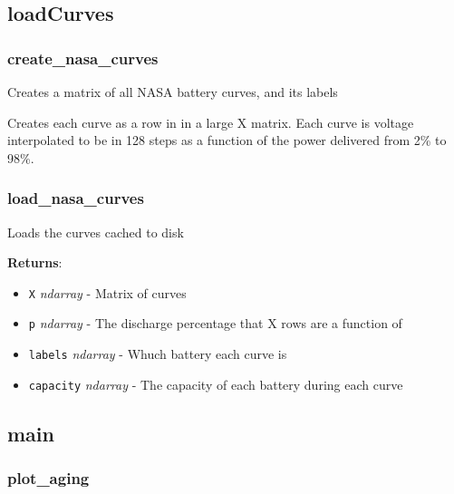\subsection{loadCurves}

\subsubsection{create\_nasa\_curves}

\begin{Shaded}
\begin{Highlighting}[]
\end{Highlighting}
\end{Shaded}

Creates a matrix of all NASA battery curves, and its labels

Creates each curve as a row in in a large X matrix. Each curve is
voltage interpolated to be in 128 steps as a function of the power
delivered from 2\% to 98\%.

\subsubsection{load\_nasa\_curves}

\begin{Shaded}
\begin{Highlighting}[]
\end{Highlighting}
\end{Shaded}

Loads the curves cached to disk

\textbf{Returns}:

\begin{itemize}
\tightlist
\item
  \texttt{X} \emph{ndarray} - Matrix of curves
\item
  \texttt{p} \emph{ndarray} - The discharge percentage that X rows are a
  function of
\item
  \texttt{labels} \emph{ndarray} - Whuch battery each curve is
\item
  \texttt{capacity} \emph{ndarray} - The capacity of each battery during
  each curve
\end{itemize}

\subsection{main}

\subsubsection{plot\_aging}

